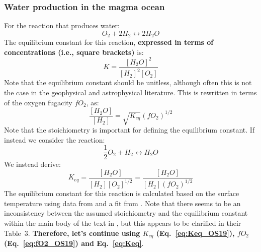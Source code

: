 \subsubsection{Water production in the magma ocean}
For the reaction that produces water:
\begin{equation}
    {O_2} + 2H_2 \leftrightarrow 2H_2O
    \label{eq:altreaction} 
\end{equation}
The equilibrium constant for this reaction, \textbf{expressed in terms of concentrations (i.e., square brackets)} is:
\begin{equation}
    K = \frac{[H_2O]^2}{[H_2]^2[O_2]}
\end{equation}
Note that the equilibrium constant should be unitless, although often this is not the case in the geophysical and astrophysical literature.
This is rewritten in terms of the oxygen fugacity $fO_2$, as: 
\begin{equation}
    \frac{[H_2O]}{[H_2]} = \sqrt{K_{eq}} \left(fO_2\right)^{1/2}
\end{equation}
Note that the stoichiometry is important for defining the equilibrium constant.  If instead we consider the reaction:
\begin{equation}
    \frac{1}{2} O_2 + H_2 \leftrightarrow H_2O
    \label{eq:reaction}
\end{equation}
We instead derive:
\begin{equation}
     K_{eq} = \frac{[H_2O]}{[H_2] [O_2]^{1/2}} = \frac{[H_2O]}{[H_2] \left(fO_2\right)^{1/2}}
    \label{eq:Keq}
\end{equation}
The equilibrium constant for this reaction is calculated based on the surface temperature using data from \cite{RBF78} and a fit from \cite{OS19}.  Note that there seems to be an inconsistency between the assumed stoichiometry and the equilibrium constant within the main body of the text in \cite{OS19}, but this appears to be clarified in their Table~3.  \textbf{Therefore, let's continue using $K_{eq}$ (Eq.~\ref{eq:Keq_OS19}), $fO_2$ (Eq.~\ref{eq:fO2_OS19}) and Eq.~\ref{eq:Keq}}.
